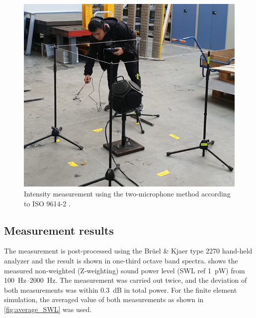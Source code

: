 \begin{figure}[H]
\begin{center}
\includegraphics[width=12cm]{fig/Sound_power_measurement_2.png}
\caption{Intensity measurement using the two-microphone method according to ISO 9614-2 \cite{din19969614}.}
\label{fig:scanningmethod}
\end{center}
\end{figure}

\subsection*{Measurement results}

The measurement is post-processed using the Brüel \& Kjaer type 2270 hand-held analyzer and the result is shown in one-third octave band spectra.  shows the measured non-weighted (Z-weighting) sound power level (SWL ref \SI{1}{\pico\watt}) from \SIrange{100}{2000}{\hertz}. The measurement was carried out twice, and the deviation of both measurements was  within \SI{0.3}{\dB} in total power. For the finite element simulation, the averaged value of both measurements as shown in \cref{fig:average_SWL} was used.

